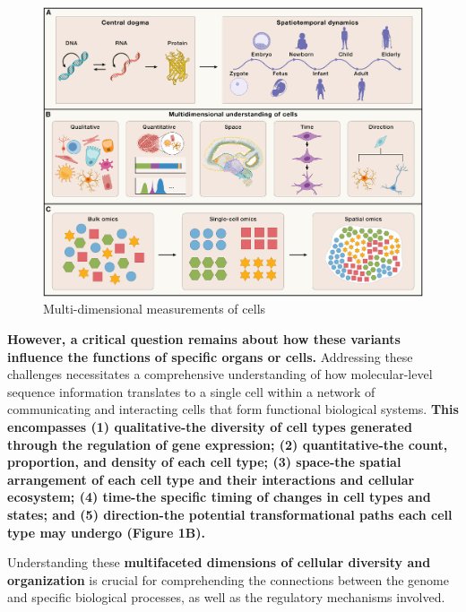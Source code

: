 \documentclass[
]{book}
\begin{document}
\begin{figure}
\centering
\includegraphics{./figs/spatialtech/Multi-dimensional measurements of cells.jpg}
\caption{Multi-dimensional measurements of cells}
\end{figure}

\textbf{However, a critical question remains about how these variants influence the functions of specific organs or cells.}
Addressing these challenges necessitates a comprehensive understanding of how molecular-level sequence information translates to a single cell within a network of communicating and interacting cells that form functional biological systems. \textbf{This encompasses (1) qualitative-the diversity of cell types generated through the regulation of gene expression; (2) quantitative-the count, proportion, and density of each cell type; (3) space-the spatial arrangement of each cell type and their interactions and cellular ecosystem; (4) time-the specific timing of changes in cell types and states; and (5) direction-the potential transformational paths each cell type may undergo (Figure 1B).}

Understanding these \textbf{multifaceted dimensions of cellular diversity and organization} is crucial for comprehending the connections between the genome and specific biological processes, as well as the regulatory mechanisms involved.
\end{document}
